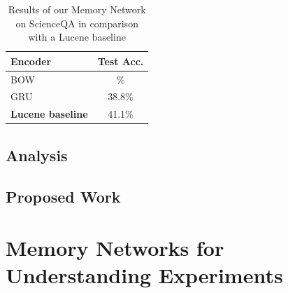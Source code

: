 \begin{table}
    \centering
    \begin{tabular}{|l|c|}
    \hline
    \textbf{Encoder} & \textbf{Test Acc.}\\
    \hline
    BOW & \% \\
    GRU & 38.8\% \\
    \hline
    \hline
    \textbf{Lucene baseline} & 41.1\% \\
    \hline
    \end{tabular}
    \caption{Results of our Memory Network on ScienceQA in comparison with a Lucene baseline}
    \label{tab:memnet_qa_results}
\end{table}

\subsection{Analysis}

\subsection{Proposed Work}


\section{Memory Networks for Understanding Experiments}
